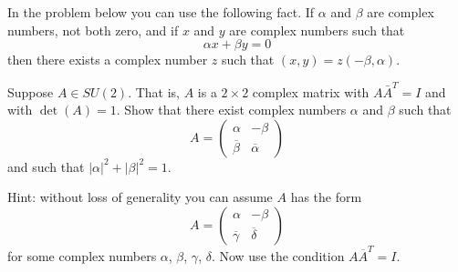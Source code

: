 \documentclass[minion]{homework}
\begin{document}
\begin{problems}
In the problem below you can use the following fact.  If $\alpha$ and $\beta$ 
are complex numbers, not both zero, and if $x$ and $y$ are complex numbers
such that
\[
\alpha x + \beta y = 0
\]
then there exists a complex number $z$ such that $(x,y)=z(-\beta,\alpha)$.

\problem Suppose $A\in SU(2)$.  That is, $A$ is a $2\times 2$ complex matrix
with $A\bar{A}^T=I$ and with $\det(A)=1$.  Show that there exist complex numbers $\alpha$
and $\beta$ such that
\[
A = \begin{pmatrix} \alpha & -\beta\\ \overline{\beta} & \overline{\alpha}\end{pmatrix}
\]
and such that $|\alpha|^2+|\beta|^2=1$.

Hint: without loss of generality you can assume $A$ has the form
\[
A = \begin{pmatrix} 
\alpha & -\beta\\ \overline{\gamma} & \overline{\delta}\end{pmatrix}
\]
for some complex numbers $\alpha$, $\beta$, $\gamma$, $\delta$.  Now use
the condition $A\overline{A}^T=I$.
\end{problems}
\end{document}
